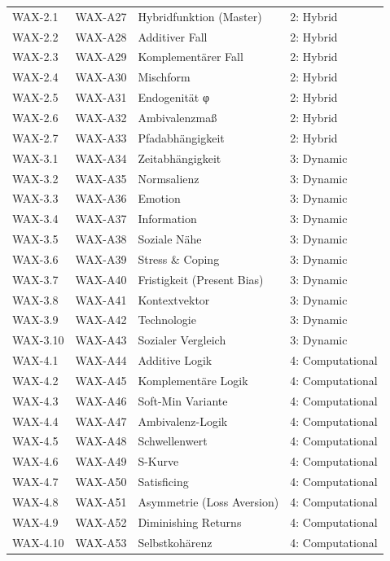 \begin{longtable}{@{}llll@{}}
WAX-2.1 & WAX-A27 & Hybridfunktion (Master) & 2: Hybrid \\
WAX-2.2 & WAX-A28 & Additiver Fall & 2: Hybrid \\
WAX-2.3 & WAX-A29 & Komplementärer Fall & 2: Hybrid \\
WAX-2.4 & WAX-A30 & Mischform & 2: Hybrid \\
WAX-2.5 & WAX-A31 & Endogenität φ & 2: Hybrid \\
WAX-2.6 & WAX-A32 & Ambivalenzmaß & 2: Hybrid \\
WAX-2.7 & WAX-A33 & Pfadabhängigkeit & 2: Hybrid \\
\midrule

WAX-3.1 & WAX-A34 & Zeitabhängigkeit & 3: Dynamic \\
WAX-3.2 & WAX-A35 & Normsalienz & 3: Dynamic \\
WAX-3.3 & WAX-A36 & Emotion & 3: Dynamic \\
WAX-3.4 & WAX-A37 & Information & 3: Dynamic \\
WAX-3.5 & WAX-A38 & Soziale Nähe & 3: Dynamic \\
WAX-3.6 & WAX-A39 & Stress \& Coping & 3: Dynamic \\
WAX-3.7 & WAX-A40 & Fristigkeit (Present Bias) & 3: Dynamic \\
WAX-3.8 & WAX-A41 & Kontextvektor & 3: Dynamic \\
WAX-3.9 & WAX-A42 & Technologie & 3: Dynamic \\
WAX-3.10 & WAX-A43 & Sozialer Vergleich & 3: Dynamic \\
\midrule

WAX-4.1 & WAX-A44 & Additive Logik & 4: Computational \\
WAX-4.2 & WAX-A45 & Komplementäre Logik & 4: Computational \\
WAX-4.3 & WAX-A46 & Soft-Min Variante & 4: Computational \\
WAX-4.4 & WAX-A47 & Ambivalenz-Logik & 4: Computational \\
WAX-4.5 & WAX-A48 & Schwellenwert & 4: Computational \\
WAX-4.6 & WAX-A49 & S-Kurve & 4: Computational \\
WAX-4.7 & WAX-A50 & Satisficing & 4: Computational \\
WAX-4.8 & WAX-A51 & Asymmetrie (Loss Aversion) & 4: Computational \\
WAX-4.9 & WAX-A52 & Diminishing Returns & 4: Computational \\
WAX-4.10 & WAX-A53 & Selbstkohärenz & 4: Computational \\
\midrule


\end{longtable}
